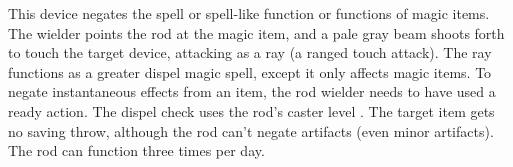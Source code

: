 \begin{comment}
\prereq{Craft Rod, Enlarge Spell}

\itemdescription{Metamagic, Extend}{(Lesser) 4,500 gp (7th}; (normal) 10,000 gp (10th); (greater) 18,000}{12th}{\x}{(Lesser) 8th; (normal) 12th; (greater) 16th}{(Lesser) faint (no school); (normal) moderate (no school); (greater) strong (no school)}{\x} The wielder can cast up to three spells per day that are extended as though using the Extend Spell feat.

\prereq{Craft Rod, Extend Spell}

\itemdescription{Metamagic, Maximize}{(Lesser) 12,500 gp (11th); (normal) 21,000 gp  (13th); 32,000}{15th}{\x}{(Lesser) 8th; (normal) 12th; (greater) 16th}{(Lesser) faint (no school); (normal) moderate (no school); (greater) strong (no school)}{\x} The wielder can cast up to three spells per day that are maximized as though using the Maximize Spell feat.

Strong (no school); CL 17th; Craft Rod, Maximize Spell feat; Price 14,000 gp (lesser), 54,000 gp (normal), 121,500 gp (greater).

\itemdescription{Metamagic, Quicken}{(Lesser) 18,000 gp (11th); (normal) 21,000 gp  (13th); 32,000}{15th}{\x}{(Lesser) 8th; (normal) 12th; (greater) 16th}{(Lesser) faint (no school); (normal) moderate (no school); (greater) strong (no school)}{\x}
\parhead{Metamagic, Quicken} The wielder can cast up to three spells per day that are quickened as though using the Quicken Spell feat.

Strong (no school); CL 17th; Craft Rod, Quicken Spell; Price 35,000 gp (lesser), 75,500 gp (normal), 170,000 gp (greater).

\parhead{Metamagic, Silent} The wielder can cast up to three spells per day without verbal components as though using the Silent Spell feat.

Strong (no school); CL 17th; Craft Rod, Silent Spell; Price 3,000 gp (lesser), 11,000 gp (normal), 24,500 gp (greater).
\end{comment}

 This device negates the spell or spell-like function or functions of magic items. The wielder points the rod at the magic item, and a pale gray beam shoots forth to touch the target device, attacking as a ray (a ranged touch attack). The ray functions as a greater dispel magic spell, except it only affects magic items. To negate instantaneous effects from an item, the rod wielder needs to have used a ready action. The dispel check uses the rod's caster level . The target item gets no saving throw, although the rod can't negate artifacts (even minor artifacts). The rod can function three times per day.

